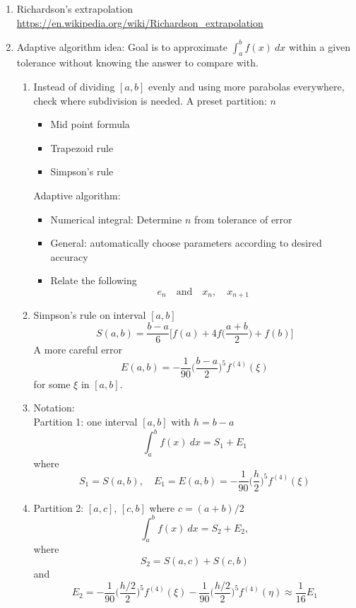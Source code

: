 \documentclass{article}
\theoremstyle{remark}
\begin{document}
\begin{enumerate}
\item Richardson's extrapolation \\
\url{https://en.wikipedia.org/wiki/Richardson_extrapolation}

\item Adaptive algorithm idea: Goal is to approximate $\int_a^b f(x)~dx$ within a given tolerance without knowing the answer to compare with.
\begin{enumerate}
\item Instead of dividing $[a,b]$ evenly and using more parabolas everywhere, check where subdivision is needed. A preset partition: $n$ 
\begin{itemize}
\item Mid point formula
\item Trapezoid rule
\item Simpson's rule
\end{itemize}
Adaptive algorithm: 
\begin{itemize}
\item Numerical integral: Determine $n$ from tolerance of error
\item General: automatically choose parameters according to desired accuracy
\item Relate the following
$$
e_n \quad\text{and} \quad x_n, \quad x_{n+1}
$$
\end{itemize}

\item Simpson's rule on interval $[a,b]$
$$
S(a,b)  = \frac{b-a}{6}\Big[f(a)+ 4f\Big(\frac{a+b}{2}\Big)+f(b)\Big]
$$
A more careful error
$$
E(a,b) = -\frac{1}{90}\Big(\frac{b-a}{2}\Big)^5f^{(4)}(\xi)
$$
for some $\xi$ in $[a,b]$.

\item Notation: \\[0.1in]
Partition 1: one interval $[a,b]$ with $h = b-a$
$$
\int_a^b f(x)~dx = S_1 + E_1
$$
where
$$
S_1 = S(a,b),\quad E_1 = E(a,b) = -\frac{1}{90}\Big(\frac{h}{2}\Big)^5f^{(4)}(\xi)
$$

\item Partition 2: $[a,c]$, $[c,b]$ where $c = (a+b)/2$
$$
\int_a^b f(x)~dx = S_2 + E_2,
$$
where
$$
S_2 = S(a,c)+ S(c,b)
$$
and
$$
E_2 = -\frac{1}{90}\Big(\frac{h/2}{2}\Big)^5f^{(4)}(\xi)-\frac{1}{90}\Big(\frac{h/2}{2}\Big)^5f^{(4)}(\eta)  \approx \frac{1}{16}E_1
$$



\end{enumerate}
\end{enumerate}
\end{document}
